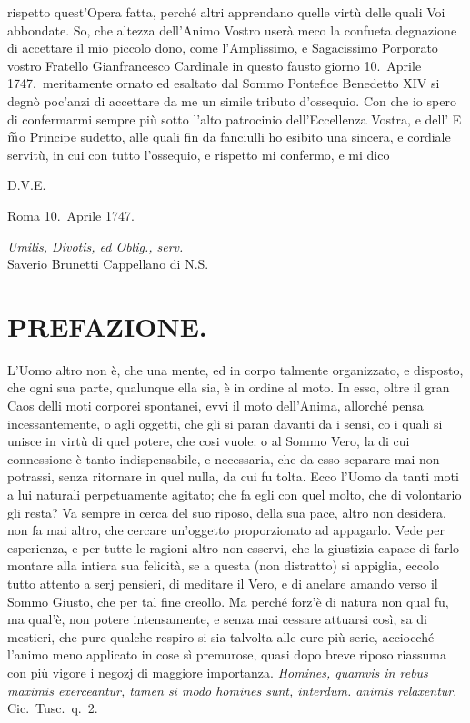 \documentclass[11pt,a6paper]{article}
\begin{document}
rispetto quest'Opera fatta, perché altri
apprendano quelle virtù delle quali Voi
abbondate. So, che altezza dell'Animo
Vostro userà meco la confueta degnazione
di accettare il mio piccolo dono, come
l'Amplissimo, e Sagacissimo Porporato vostro
Fratello Gianfrancesco Cardinale in
questo fausto giorno 10.\ Aprile 1747.\
meritamente ornato ed esaltato dal Sommo
Pontefice Benedetto XIV si degnò poc'anzi
di accettare da me un simile tributo
d'ossequio. Con che io spero di confermarmi
sempre più sotto l'alto patrocinio
dell'Eccellenza Vostra, e dell' E$\widetilde{\textup{m}}$o Principe
sudetto, alle quali fin da fanciulli ho esibito
una sincera, e cordiale servitù, in cui
con tutto l'ossequio, e rispetto mi confermo,
e mi dico

\vfill

D.V.E.

\vfill

Roma 10.\ Aprile 1747.
\vfill

{\flushright
 \textit{Umilis, Divotis, ed Oblig., serv.}\\
Saverio Brunetti Cappellano di N.S.

\vfill


}

\section{PREFAZIONE.}

\lettrine{L}{'U}omo altro non è, che una
mente, ed in corpo talmente
organizzato, e disposto,
che ogni sua parte, qualunque
ella sia, è in ordine al
moto. In esso, oltre il gran
Caos delli moti corporei spontanei, evvi il
moto dell'Anima, allorché pensa
incessantemente, o agli oggetti, che gli si paran
davanti da i sensi, co i quali si unisce in virtù di
quel potere, che cosi vuole: o al Sommo
Vero, la di cui connessione è tanto
indispensabile, e necessaria, che da esso separare
mai non potrassi, senza ritornare in quel
nulla, da cui fu tolta. Ecco l'Uomo da tanti
moti a lui naturali perpetuamente agitato;
che fa egli con quel molto, che di volontario
gli resta? Va sempre in cerca del suo
riposo, della sua pace, altro non desidera,
non fa mai altro, che cercare un'oggetto
proporzionato ad appagarlo. Vede per esperienza,
e per tutte le ragioni altro non esservi,
che la giustizia capace di farlo montare
alla intiera sua felicità, se a questa (non distratto)
si appiglia, eccolo tutto attento a
serj pensieri, di meditare il Vero, e di anelare
amando verso il Sommo Giusto, che per
tal fine creollo. Ma perché forz'è di natura
non qual fu, ma qual'è, non potere intensamente,
e senza mai cessare attuarsi così,
sa di mestieri, che pure qualche respiro si sia
talvolta alle cure più serie, acciocché l'animo
meno applicato in cose sì premurose,
quasi dopo breve riposo riassuma con più vigore
i negozj di maggiore importanza. \textit{Homines, quamvis in rebus maximis exerceantur, tamen si modo homines sunt, interdum.
animis relaxentur}. Cic.\ Tusc.\ q.\ 2.
\end{document}
